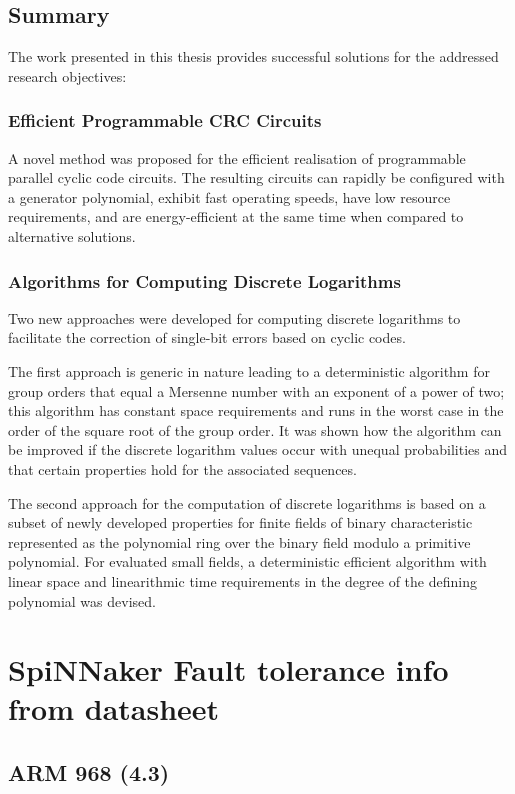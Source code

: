 \documentclass[oneside, a4paper, 11pt]{memoir}
\begin{document}
\section{Summary}
The work presented in this thesis provides successful solutions for the addressed research objectives:

\subsection{Efficient Programmable CRC Circuits}

A novel method was proposed for the efficient realisation of programmable parallel cyclic code circuits. The resulting circuits can rapidly be configured with a generator polynomial, exhibit fast operating speeds, have low resource requirements, and are energy-efficient at the same time when compared to alternative solutions.

\subsection{Algorithms for Computing Discrete Logarithms}

Two new approaches were developed for computing discrete logarithms to facilitate the correction of single-bit errors based on cyclic codes.

The first approach is generic in nature leading to a deterministic algorithm for group orders that equal a Mersenne number with an exponent of a power of two; this algorithm has constant space requirements and runs in the worst case in the order of the square root of the group order. It was shown how the algorithm can be improved if the discrete logarithm values occur with unequal probabilities and that certain properties hold for the associated sequences.

The second approach for the computation of discrete logarithms is based on a subset of newly developed properties for finite fields of binary characteristic represented as the polynomial ring over the binary field modulo a primitive polynomial. For evaluated small fields, a deterministic efficient algorithm with linear space and linearithmic time requirements in the degree of the defining polynomial was devised.

\chapter{SpiNNaker Fault tolerance info from datasheet}
\section{ARM 968 (4.3)}
\end{document}
